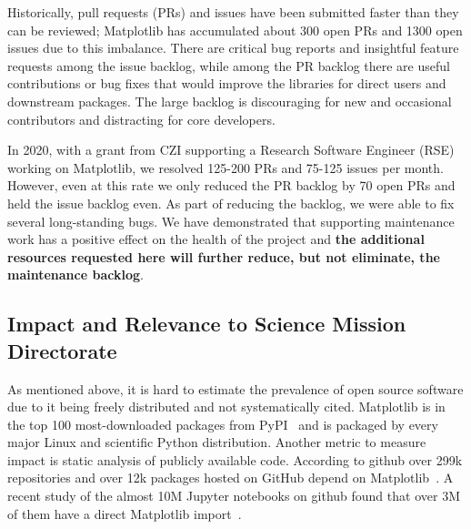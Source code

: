 \documentclass[12pt]{article}
\numberwithin{page}{section}
\begin{document}

Historically, pull requests (PRs) and issues have been submitted
faster than they can be reviewed; Matplotlib has accumulated about 300
open PRs and 1300 open issues due to this imbalance. There are
critical bug reports and insightful feature requests among the issue
backlog, while among the PR backlog there are useful contributions or
bug fixes that would improve the libraries for direct users and
downstream packages.  The large backlog is discouraging for new and
occasional contributors and distracting for core developers.

In 2020, with a grant from CZI supporting a Research Software Engineer (RSE)
working on Matplotlib, we resolved 125-200 PRs and
75-125 issues per month.  However, even at this rate we only
reduced the PR backlog by 70 open PRs and held the issue
backlog even.  As part of reducing the backlog, we were able to fix several
long-standing bugs.  We have demonstrated that supporting maintenance
work has a positive effect on the health of the project and
\textbf{the additional resources requested here will further reduce,
  but not eliminate, the maintenance backlog}.



\subsection{Impact and Relevance to Science Mission Directorate}

As mentioned above, it is hard to estimate the prevalence of open
source software due to it being freely distributed and not
systematically cited.  Matplotlib is in the top 100 most-downloaded
packages from PyPI~\cite{pypi_stats} and is packaged by every major
Linux and scientific Python distribution.  Another metric to measure
impact is static analysis of publicly available code.  According to
github over 299k repositories and over 12k packages hosted on GitHub
depend on Matplotlib~\cite{gh_deps:2021}. A recent study of the
almost 10M Jupyter notebooks on github found that over 3M of them have
a direct Matplotlib import~\cite{datalore:2020}.
\end{document}

